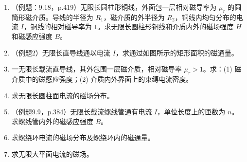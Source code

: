 \documentclass{ctexart}
\begin{document}
\begin{enumerate}
\item（例题：9.18，p.419）无限长圆柱形铜线，外面包一层相对磁导率为 $\mu_r$ 的圆筒形磁介质。导线的半径为 $R_1$，磁介质的外半径为 $R_2$，铜线内均匀分布的电流 $I$，铜线的相对磁导率为 $1$。求无限长圆柱形铜线和介质内外的磁场强度 $H$ 和磁感应强度 $B$。

\item（例题2）无限长直导线通以电流 $I$，求通过如图所示的矩形面积的磁通量。

\item 一无限长载流直导线，其外包围一层磁介质，相对磁导率 $\mu_r > 1$。求：(1) 磁介质中的磁感应强度；(2) 介质内外界面上的束缚电流密度。

\item 求无限长圆柱面电流的磁场分布。

\item（例题9.9，p.384）无限长载流螺线管通有电流 $I$，单位长度上的匝数为 $n$。求螺线管内外的磁感应强度 $B$。

\item 求螺绕环电流的磁场分布及螺绕环内的磁通量。

\item 求无限大平面电流的磁场。

\end{enumerate}
\end{document}
